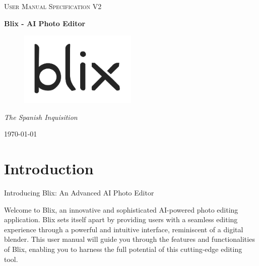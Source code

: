 \documentclass[11pt,a4paper]{article}
\begin{document}
\begin{titlepage}
	\centering
    {\scshape\LARGE User Manual Specification V2\par}
    \vspace{1.5cm}
    {\huge\bfseries Blix - AI Photo Editor\par}
    \vspace{2.5cm}
    \begin{figure}[h]
        \centering %
        \includegraphics[width=0.5\textwidth]{../pics/blix.png}
    \end{figure}
    \vspace{2.5cm}
    {\Large\itshape The Spanish Inquisition\par}

    \vfill
    {\large \today\par}
\end{titlepage}

\tableofcontents
\pagebreak


\section*{Introduction}

Introducing Blix: An Advanced AI Photo Editor

Welcome to Blix, an innovative and sophisticated AI-powered photo editing application. Blix sets itself apart by providing users with a seamless editing experience through a powerful and 
intuitive interface, reminiscent of a digital blender. This user manual will guide you through the features and functionalities of Blix, enabling you to harness the full potential of 
this cutting-edge editing tool.
\end{document}
